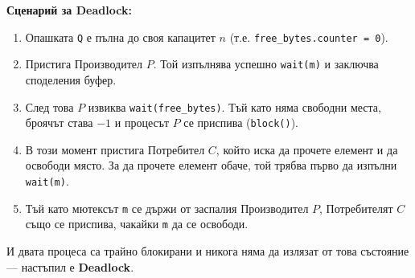\documentclass{scrartcl}
\begin{document}
\begin{FlushLeft}
\textbf{Сценарий за Deadlock:}
\begin{enumerate}
    \item Опашката \lstinline|Q| е пълна до своя капацитет $n$ (т.е. \lstinline|free_bytes.counter = 0|).
    \item Пристига Производител $P$. Той изпълнява успешно \lstinline|wait(m)| и заключва споделения буфер.
    \item След това $P$ извиква \lstinline|wait(free_bytes)|. Тъй като няма свободни места, броячът става $-1$ и процесът $P$ се приспива (\lstinline|block()|).
    \item В този момент пристига Потребител $C$, който иска да прочете елемент и да освободи място. За да прочете елемент обаче, той трябва първо да изпълни \lstinline|wait(m)|.
    \item Тъй като мютексът \lstinline|m| се държи от заспалия Производител $P$, Потребителят $C$ също се приспива, чакайки \lstinline|m| да се освободи.
\end{enumerate}
И двата процеса са трайно блокирани и никога няма да излязат от това състояние --- настъпил е \textbf{Deadlock}.

\end{FlushLeft}
\end{document}
